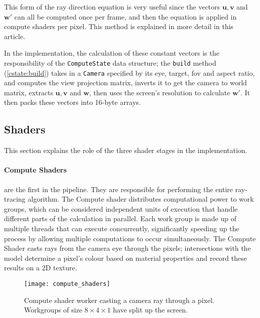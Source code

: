 This form of the ray direction equation is very useful since the vectors $\bm{u}, \bm{v}$ and $\bm{w'}$ can all be computed once per frame, and then the equation is applied in compute shaders per pixel. This method is explained in more detail in this article\supercite{camera_rays}.


In the implementation, the calculation of these constant vectors is the responsibility of the \verb|ComputeState| data structure; the \verb|build| method (\cref{cstate:build}) takes in a \verb|Camera| specified by its eye, target, \acrshort{fov} and aspect ratio, and computes the view projection matrix, inverts it to get the camera to world matrix, extracts $\bm{u}, \bm{v}$ and $\bm{w}$, then uses the screen's resolution to calculate $\bm{w'}$. It then packs these vectors into 16-byte arrays.

\subsection{Shaders}
This section explains the role of the three shader stages in the implementation.

\begin{multicols}{2}
  \paragraph{Compute Shaders} are the first in the pipeline. They are responsible for performing the entire ray-tracing algorithm. The Compute shader distributes computational power to work groups, which can be considered independent units of execution that handle different parts of the calculation in parallel.
  Each work group is made up of multiple threads that can execute concurrently, significantly speeding up the process by allowing multiple computations to occur simultaneously.
  The Compute Shader casts rays from the camera eye through the pixels; intersections with the model determine a pixel's colour based on material properties and record these results on a 2D texture.

  \begin{figure}[H]
    \centering
    \texttt{[image: compute\_shaders]}
    \caption[Compute shader visualization]{Compute shader worker casting a camera ray through a pixel. Workgroups of size $8\times4\times1$ have split up the screen.}
  \end{figure}
\end{multicols}
